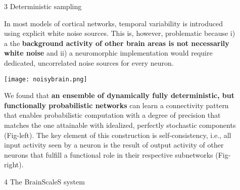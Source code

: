 \begin{frame}
\begin{columns}
\begin{column}{0.99\textwidth}
\begin{columns}[t]
\begin{column}{0.32\textwidth}
				\end{column}

				\begin{column}{.01\textwidth}\end{column}

				\begin{column}{0.32\textwidth}


					\begin{block}{\large 3 Deterministic sampling}
					\blockSpaceOne

					\begin{adjustwidth}{1.cm}{1.cm}
					\justifying
					In most models of cortical networks, temporal variability is introduced using explicit white noise sources.
					This is, however, problematic because i) a the \textbf{background activity of other brain areas is not necessarily white noise} and ii) a neuromorphic implementation would require dedicated, uncorrelated noise sources for every neuron. 
					\end{adjustwidth}

					\thirdBlockImSpace
					\begin{center}
						\texttt{[image: noisybrain.png]}
					\end{center}
					\thirdBlockImSpace

					\begin{adjustwidth}{1.cm}{1.cm}
					\justifying

					We  found \cite{dold2019stochasticity} that \textbf{an  ensemble  of  dynamically  fully  deterministic,  but functionally probabilistic networks} can learn a connectivity pattern that enables probabilistic computation with a degree of precision that matches the one attainable with idealized,  perfectly  stochastic  components (Fig-left).
					The  key  element  of  this  construction  is  self-consistency, i.e.,  all input activity seen by a neuron is the result of output activity of other neurons that fulfill a functional role in their respective subnetworks (Fig-right).
					
					\end{adjustwidth}

					\blockSpaceOne
					\end{block}

					\interBlockSpaceOne
					\vspace{-0.175cm}

					
				\begin{block}{\large 4 The BrainScaleS system}
					\blockSpaceOne



\end{block}
\end{column}
\end{columns}
\end{column}
\end{columns}
\end{frame}
